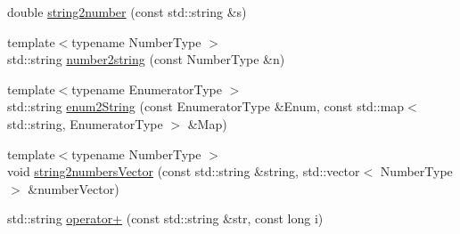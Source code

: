 \begin{DoxyCompactItemize}
double \hyperlink{namespaceLifeV_a95341022bde9111ea53dfe204cbe70ae}{string2number} (const std\-::string \&s)
\item 
{\footnotesize template$<$typename Number\-Type $>$ }\\std\-::string \hyperlink{namespaceLifeV_a3c2a31cefb08654a69273a1a3bf11fac}{number2string} (const Number\-Type \&n)
\item 
{\footnotesize template$<$typename Enumerator\-Type $>$ }\\std\-::string \hyperlink{namespaceLifeV_a2e64a35012f78d9ab021477590e3bfaf}{enum2\-String} (const Enumerator\-Type \&Enum, const std\-::map$<$ std\-::string, Enumerator\-Type $>$ \&Map)
\item 
{\footnotesize template$<$typename Number\-Type $>$ }\\void \hyperlink{namespaceLifeV_a5f2c3319750ceebbeb2a3bb374a2596b}{string2numbers\-Vector} (const std\-::string \&string, std\-::vector$<$ Number\-Type $>$ \&number\-Vector)
\item 
std\-::string \hyperlink{namespaceLifeV_aed80af702e5521c5fc90b0c33bbd5af3}{operator+} (const std\-::string \&str, const long i)
\end{DoxyCompactItemize}


